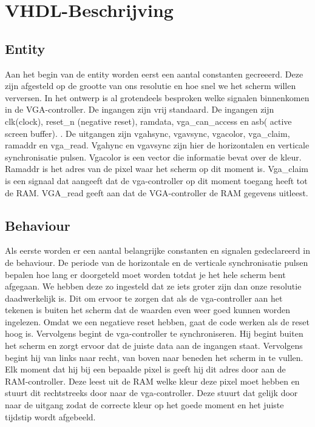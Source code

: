 \documentclass{scrartcl}  %
\begin{document}
\section{VHDL-Beschrijving}
\subsection{Entity}
Aan het begin van de entity worden eerst een aantal constanten gecreeerd. Deze zijn afgesteld op de grootte van ons resolutie en hoe snel we het scherm willen verversen. In het ontwerp is al grotendeels besproken welke signalen binnenkomen in de VGA-controller. De ingangen zijn vrij standaard. De ingangen zijn clk(clock), reset\_n (negative reset), ramdata, vga\_can\_access en asb( active screen buffer). . De uitgangen zijn vgahsync, vgavsync, vgacolor, vga\_claim, ramaddr en vga\_read. Vgahync en vgavsync zijn hier de horizontalen en verticale synchronisatie pulsen. Vgacolor is een vector die informatie bevat over de kleur. Ramaddr is het adres van de pixel waar het scherm op dit moment is. Vga\_claim is een signaal dat aangeeft dat de vga-controller op dit moment toegang heeft tot de RAM. VGA\_read geeft aan dat de VGA-controller de RAM gegevens uitleest.

\subsection{Behaviour}
Als eerste worden er een aantal belangrijke constanten en signalen gedeclareerd in de behaviour. De periode van de horizontale en de verticale synchronisatie pulsen bepalen hoe lang er doorgeteld moet worden totdat je het hele scherm bent afgegaan. We hebben deze zo ingesteld dat ze iets groter zijn dan onze resolutie daadwerkelijk is. Dit om ervoor te zorgen dat als de vga-controller aan het tekenen is buiten het scherm dat de waarden even weer goed kunnen worden ingelezen. Omdat we een negatieve reset hebben, gaat de code werken als de reset hoog is. Vervolgens begint de vga-controller te synchroniseren. Hij begint buiten het scherm en zorgt ervoor dat de juiste data aan de ingangen staat. Vervolgens begint hij van links naar recht, van boven naar beneden het scherm in te vullen. Elk moment dat hij bij een bepaalde pixel is geeft hij dit adres door aan de RAM-controller. Deze leest uit de RAM welke kleur deze pixel moet hebben en stuurt dit rechtstreeks door naar de vga-controller. Deze stuurt dat gelijk door naar de uitgang zodat de correcte kleur op het goede moment en het juiste tijdstip wordt afgebeeld. 
\end{document}
